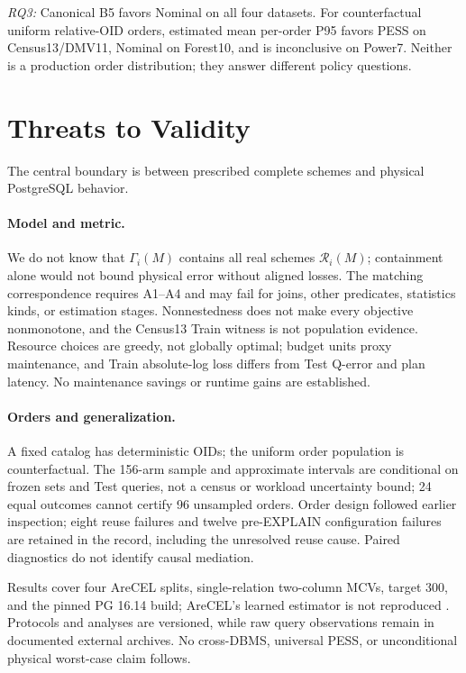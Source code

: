 \documentclass[sigconf, nonacm]{acmart}
\begin{document}
\emph{RQ3:} Canonical B5 favors Nominal on all four datasets.
For counterfactual uniform relative-OID orders, estimated mean
per-order P95 favors PESS on Census13/DMV11, Nominal on Forest10,
and is inconclusive on Power7. Neither is a production order
distribution; they answer different policy questions.
\section{Threats to Validity}
\label{sec:validity}
The central boundary is between prescribed complete schemes and
physical PostgreSQL behavior.

\paragraph{Model and metric.}
We do not know that \(\Gamma_i(M)\) contains all real schemes
\(\mathcal R_i(M)\); containment alone would not bound physical error
without aligned losses. The matching correspondence requires
A1--A4 and may fail for joins, other predicates, statistics kinds,
or estimation stages. Nonnestedness does not make every objective
nonmonotone, and the Census13 Train witness is not population
evidence. Resource choices are greedy, not globally optimal;
budget units proxy maintenance, and Train absolute-log loss differs
from Test Q-error and plan latency. No maintenance savings or
runtime gains are established.

\paragraph{Orders and generalization.}
A fixed catalog has deterministic OIDs; the uniform order population
is counterfactual. The 156-arm sample and approximate intervals are
conditional on frozen sets and Test queries, not a census or workload
uncertainty bound; 24 equal outcomes cannot certify 96 unsampled
orders. Order design followed earlier inspection; eight reuse
failures and twelve pre-EXPLAIN configuration failures are retained
in the record, including the unresolved reuse cause. Paired
diagnostics do not identify causal mediation.

Results cover four AreCEL splits, single-relation two-column MCVs,
target 300, and the pinned PG 16.14 build; AreCEL's learned estimator
is not reproduced \cite{wang2021arecel}. Protocols and analyses are
versioned, while raw query observations remain in documented
external archives. No cross-DBMS, universal PESS, or unconditional
physical worst-case claim follows.
\end{document}
